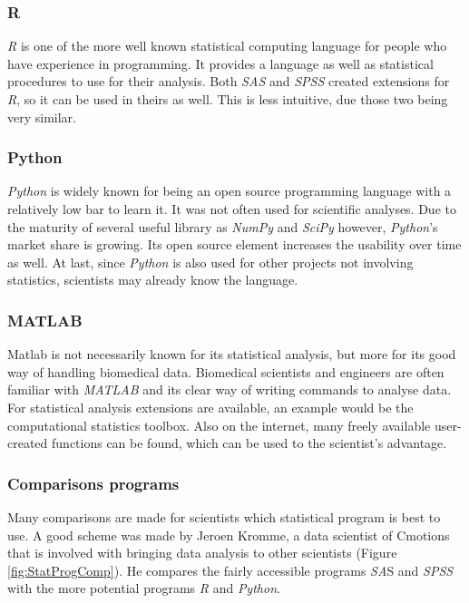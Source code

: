 \documentclass[10pt,a4paper]{report}
\begin{document}
	\subsubsection{R}
	
	\textit{R} is one of the more well known statistical computing language for people who have experience in programming. It provides a language as well as statistical procedures to use for their analysis. Both \textit{SAS} and \textit{SPSS} created extensions for \textit{R}, so it can be used in theirs as well. This is less intuitive, due those two being very similar.  \cite{muenchen2011r}
	
	\subsubsection{Python}
	
	\textit{Python} is widely known for being an open source programming language with a 
	relatively low bar to learn it. It was not often used for scientific 
	analyses. Due to the maturity of several useful library as \textit{NumPy} and \textit{SciPy} 
	however, \textit{Python}'s market share is growing. Its open source element 
	increases the usability over time as well. At last, since \textit{Python} is also 
	used for other projects not involving statistics, scientists may already 
	know the language. 
	 \cite{mckinney2010data}
	
	\subsubsection{MATLAB}
	
	Matlab is not necessarily known for its statistical analysis, but more for 
	its good way of handling biomedical data. Biomedical scientists and 
	engineers are often familiar with \textit{MATLAB} and its clear way of writing 
	commands to analyse data. For statistical analysis extensions are 
	available, an example would be the computational statistics toolbox. Also 
	on the internet, many freely available user-created functions can be found, 
	which can be used to the scientist's advantage.
	 \cite{martinez2007computational}
	
	\subsubsection{Comparisons programs}
	
	Many comparisons are made for scientists which statistical program is best 
	to use. A good scheme was made by Jeroen Kromme, a data scientist of 
	Cmotions that is involved with bringing data analysis to other scientists 
	(Figure \ref{fig:StatProgComp}). He compares the fairly accessible programs 
	\textit{SA}S and \textit{SPSS} with the more potential programs \textit{R} and 
	\textit{Python}. \cite{BlogKromme2017}
	
\end{document}

